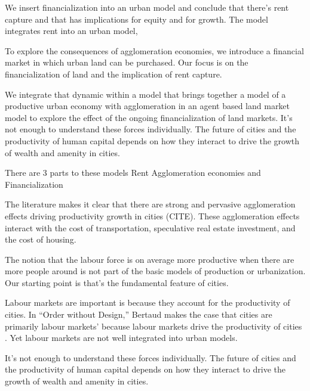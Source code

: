 We insert financialization into an urban model and conclude that there's rent capture and that has implications for equity and for growth. 
The model integrates rent into an urban model, 

To explore the consequences of agglomeration economies, we introduce a financial market in which urban land can be purchased. 
Our focus is on the financialization of land and the implication of rent capture.


We integrate that dynamic within a model that brings together a model of a productive urban economy with agglomeration in an agent based land market model to explore the effect of %
the ongoing financialization of land markets. 
It's not enough to understand these forces individually.
The future of cities and the productivity of human capital depends on how they interact to drive the growth of wealth and amenity in cities. 

There are 3 parts to these models
Rent
Agglomeration economies and 
Financialization




The literature makes it clear that there are strong and  pervasive agglomeration effects driving productivity growth in cities (CITE). %
These agglomeration effects interact with the cost of transportation, speculative real estate investment, and the cost of housing. 

The notion that the labour force is on average more productive when there are more people around is %
not part of the basic models of production or urbanization. Our starting point is that's the fundamental feature of cities. 

Labour markets are important is because they account for the productivity of cities.
In ``Order without Design,'' Bertaud makes the case that cities are primarily labour markets' because labour markets drive the productivity of cities \cite{bertaudOrderDesignHow2018}. Yet labour markets are not well integrated into urban models. 

It's not enough to understand these forces individually. The future of cities and the productivity of human capital depends on how they interact to drive the growth of wealth and amenity in cities. 

